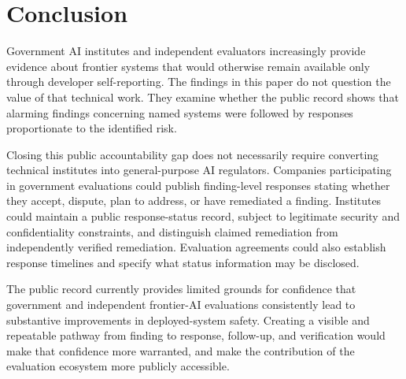 \documentclass{article}
\begin{document}
\section{Conclusion}\label{sec:conclusion}
Government AI institutes and independent evaluators increasingly provide evidence about frontier systems that would otherwise remain available only through developer self-reporting. The findings in this paper do not question the value of that technical work. They examine whether the public record shows that alarming findings concerning named systems were followed by responses proportionate to the identified risk.


Closing this public accountability gap does not necessarily require converting technical institutes into general-purpose AI regulators. Companies participating in government evaluations could publish finding-level responses stating whether they accept, dispute, plan to address, or have remediated a finding. Institutes could maintain a public response-status record, subject to legitimate security and confidentiality constraints, and distinguish claimed remediation from independently verified remediation. Evaluation agreements could also establish response timelines and specify what status information may be disclosed.

The public record currently provides limited grounds for confidence that government and independent frontier-AI evaluations consistently lead to substantive improvements in deployed-system safety. Creating a visible and repeatable pathway from finding to response, follow-up, and verification would make that confidence more warranted, and make the contribution of the evaluation ecosystem more publicly accessible.
\end{document}
